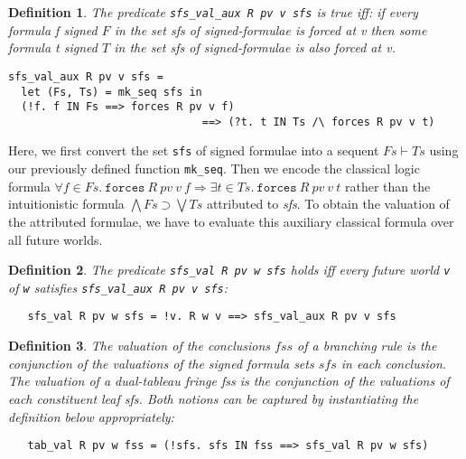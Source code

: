 \documentclass[a4paper]{article}
\newtheorem{definition}{Definition}
\begin{document}
\begin{definition}
The predicate \texttt{sfs\_val\_aux R pv v sfs} is true iff: if every
formula \textit{f} signed $F$ in the set \textit{sfs} of signed-formulae
is forced at \textit{v} then some formula \textit{t} signed $T$ in the
set \textit{sfs} of signed-formulae is also forced at \textit{v}. 
\begin{verbatim}
sfs_val_aux R pv v sfs =
  let (Fs, Ts) = mk_seq sfs in 
  (!f. f IN Fs ==> forces R pv v f) 
                              ==> (?t. t IN Ts /\ forces R pv v t)
\end{verbatim}
\end{definition}

Here, we first convert the set \texttt{sfs} of signed formulae into a
sequent $Fs \vdash Ts$ using our previously defined function
\texttt{mk\_seq}.  Then we encode the classical logic formula
$\forall f \in \mathit{Fs}.\ \mathtt{forces}~ R~ pv~ v~ f \Rightarrow \exists t
\in \mathit{Ts}.\ \mathtt{forces} ~R ~pv ~v ~t$ rather than the intuitionistic
formula $\bigwedge \mathit{Fs} \supset \bigvee \mathit{Ts}$ attributed
to \textit{sfs}. To obtain the valuation of the attributed formulae,
we have to evaluate this auxiliary classical formula over all future
worlds.
\begin{definition}
The predicate
\texttt{sfs\_val R pv w sfs}
holds iff every future world 
\texttt{v} of 
\texttt{w} satisfies
\texttt{sfs\_val\_aux R pv v sfs}:
\begin{verbatim}
   sfs_val R pv w sfs = !v. R w v ==> sfs_val_aux R pv v sfs 
\end{verbatim}
\end{definition}


\begin{definition}
The valuation of the conclusions $\mathit{fss}$ of a branching rule is the
conjunction of the valuations of the signed formula sets $\mathit{sfs}$ in
each conclusion. The valuation of a
dual-tableau fringe \textit{fss} is the conjunction of the valuations
of each constituent leaf \textit{sfs}. Both notions can be
captured by instantiating the definition below appropriately:
\begin{verbatim}
   tab_val R pv w fss = (!sfs. sfs IN fss ==> sfs_val R pv w sfs)
\end{verbatim}
\end{definition}
\end{document}
